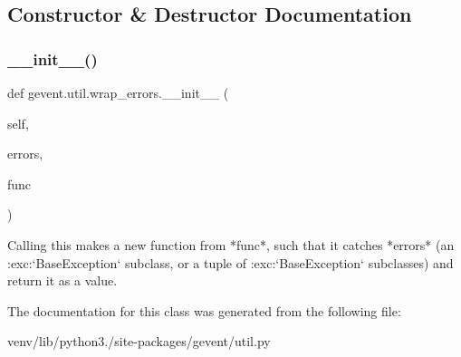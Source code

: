 \subsection{Constructor \& Destructor Documentation}
\mbox{\label{classgevent_1_1util_1_1wrap__errors_ad69e6df9bdc02cf4005dbad8e1df7eb4}} 
\subsubsection{\texorpdfstring{\+\_\+\+\_\+init\+\_\+\+\_\+()}{\_\_init\_\_()}}
{\footnotesize\ttfamily def gevent.\+util.\+wrap\+\_\+errors.\+\_\+\+\_\+init\+\_\+\+\_\+ (\begin{DoxyParamCaption}\item[{}]{self,  }\item[{}]{errors,  }\item[{}]{func }\end{DoxyParamCaption})}

\begin{DoxyVerb}Calling this makes a new function from *func*, such that it catches *errors* (an
:exc:`BaseException` subclass, or a tuple of :exc:`BaseException` subclasses) and
return it as a value.
\end{DoxyVerb}
 

The documentation for this class was generated from the following file\+:\begin{DoxyCompactItemize}
\item 
venv/lib/python3./site-\/packages/gevent/util.\+py\end{DoxyCompactItemize}
